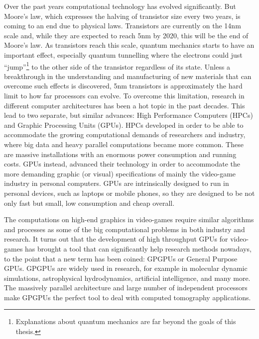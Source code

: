 Over the past years computational technology has evolved significantly. But Moore's law, which expresses the halving of transistor size every two years, is coming to an end due to physical laws. Transistors  are currently on the 14nm scale and, while they are expected to reach 5nm by 2020, this will be the end of Moore's law. As transistors reach this scale, quantum mechanics starts to have an important effect, especially quantum tunnelling where the electrons could just ``jump''\footnote{Explanations about quantum mechanics are far beyond the goals of this thesis.} to the other side of the transistor regardless of its state. Unless a breakthrough in the understanding and manufacturing of new materials that can overcome such effects is discovered, 5nm transistors is approximately the hard limit to how far processors can evolve. To overcome this limitation, research in different computer architectures has been a hot topic in the past decades. This lead to two separate, but similar advances: High Performance Computers (HPCs) and Graphic Processing Units (GPUs). HPCs developed in order to be able to accommodate the growing computational demands of researchers and industry, where big data and heavy parallel computations became more common. These are massive installations with an enormous power consumption and running costs. GPUs instead, advanced their technology in order to accommodate the more demanding graphic (or visual) specifications of mainly the video-game industry in personal computers. GPUs are intrinsically designed to run in personal devices, such as laptops or mobile phones, so they are designed to be not only fast but small, low consumption and cheap overall.

The computations on high-end graphics in video-games require similar algorithms and processes as some of the big computational problems in both industry and research. It turns out that the development of high throughput GPUs for video-games has brought a tool that can significantly help research methods nowadays, to the point that a new term has been coined: GPGPUs or General Purpose GPUs. GPGPUs are widely used in research, for example in molecular dynamic simulations\cite{phillips2005scalable}, astrophysical hydrodynamics\cite{CHOLLA}, artificial intelligence\cite{Tensorflow}, and many more. The massively parallel architecture and large number of independent processors make GPGPUs the perfect tool to deal with computed tomography applications.

